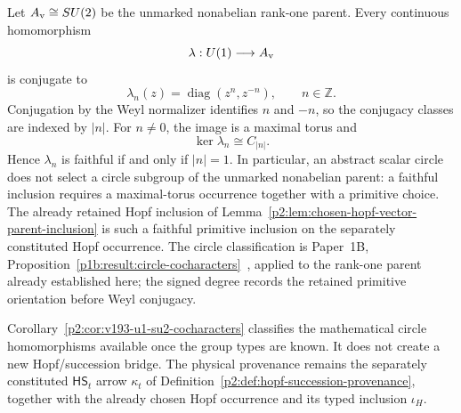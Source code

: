\documentclass[12pt,a4paper]{article}
\begin{document}
\begin{corollary}
\label{p2:cor:v193-u1-su2-cocharacters}
Let \(A_{\rm v}\cong SU(2)\) be the unmarked nonabelian rank-one parent.
Every continuous homomorphism
\[
 \lambda:U(1)\longrightarrow A_{\rm v}
\]
is conjugate to
\[
 \lambda_n(z)=\operatorname{diag}(z^n,z^{-n}),\qquad n\in\mathbb Z.
\]
Conjugation by the Weyl normalizer identifies \(n\) and \(-n\), so the
conjugacy classes are indexed by \(|n|\).  For \(n\ne0\), the image is a
maximal torus and
\[
 \ker\lambda_n\cong C_{|n|}.
\]
Hence \(\lambda_n\) is faithful if and only if \(|n|=1\).  In particular,
an abstract scalar circle does not select a circle subgroup of the unmarked
nonabelian parent: a faithful inclusion requires a maximal-torus occurrence
together with a primitive choice.  The already retained Hopf inclusion of
Lemma~\ref{p2:lem:chosen-hopf-vector-parent-inclusion} is such a faithful
primitive inclusion on the separately constituted Hopf occurrence.
The circle classification is Paper~1B,
Proposition~\ref{p1b:result:circle-cocharacters}~\cite{Kugelmann2026Paper1B},
applied to the rank-one parent already established here; the signed degree
records the retained primitive orientation before Weyl conjugacy.
\end{corollary}

\begin{remark}
\label{p2:rem:v193-u1-su2-provenance-firewall}
Corollary~\ref{p2:cor:v193-u1-su2-cocharacters} classifies the mathematical
circle homomorphisms available once the group types are known.  It does not
create a new Hopf/succession bridge.  The physical provenance remains the
separately constituted \(\mathsf{HS}_t\) arrow \(\kappa_t\) of
Definition~\ref{p2:def:hopf-succession-provenance}, together with the already
chosen Hopf occurrence and its typed inclusion \(\iota_H\).
\end{remark}
\end{document}
